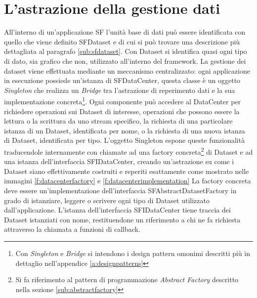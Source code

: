 \section{L'astrazione della gestione dati}
\label{sec:astrazione}
All'interno di un'applicazione \ac{SF} l'unit\`a base di dati pu\`o essere identificata con quello che viene definito SFDataset e di cui si pu\`o trovare una descrizione pi\`u dettagliata al paragrafo \ref{sub:sfdataset}. Con Dataset si identifica quasi ogni tipo di dato, sia grafico che non, utilizzato all'interno del framework.
La gestione dei dataset viene effettuata mediante un meccanismo centralizzato: ogni applicazione in esecuzione possiede un'istanza di SFDataCenter, questa classe \`e un oggetto \textit{Singleton} che realizza un \textit{Bridge}
tra l'astrazione di reperimento dati e la sua implementazione concreta\footnote{Con \textit{Singleton} e \textit{Bridge} si intendono i design pattern omonimi descritti pi\`u in dettaglio nell'appendice \ref{a:designpatterns}}.
Ogni componente pu\`o accedere al DataCenter per richiedere operazioni sui Dataset di interesse, operazioni che possono essere la lettura o la scrittura da uno stream specifico, la richiesta di una particolare istanza di un Dataset, identificata per nome, o la richiesta di una nuova istanza di Dataset, identificata per tipo.
L'oggetto Singleton espone queste funzionalit\`a traducendole internamente con chiamate ad una factory concreta\footnote{Si fa riferimento al pattern di programmazione \textit{Abstract Factory} descritto nella sezione \ref{sub:abstractfactory}}
di Dataset e ad una istanza dell'interfaccia SFIDataCenter, creando un'astrazione su come i Dataset siano effettivamente costruiti e reperiti esattamente come mostrato nelle immagini \ref{f:datacenterfactory} e \ref{f:datacenterimplementation}
La factory concreta deve essere un'implementazione dell'interfaccia SFAbstractDatasetFactory in grado di istanziare, leggere o scrivere ogni tipo di Dataset utilizzato dall'applicazione.
L'istanza dell'interfaccia SFIDataCenter tiene traccia dei Dataset istanziati con nome, restituendone un riferimento a chi ne fa richiesta attraverso la chiamata a funzioni di callback.

